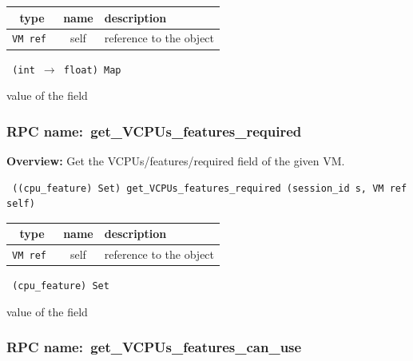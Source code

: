 
 
\vspace{0.3cm}
\begin{tabular}{|c|c|p{7cm}|}
 \hline
{\bf type} & {\bf name} & {\bf description} \\ \hline
{\tt VM ref } & self & reference to the object \\ \hline 

\end{tabular}

\vspace{0.3cm}

{\tt 
(int $\rightarrow$ float) Map
}


value of the field
\vspace{0.3cm}
\vspace{0.3cm}
\vspace{0.3cm}
\subsubsection{RPC name:~get\_VCPUs\_features\_required}

{\bf Overview:} 
Get the VCPUs/features/required field of the given VM.

\begin{verbatim} ((cpu_feature) Set) get_VCPUs_features_required (session_id s, VM ref self)\end{verbatim}



 
\vspace{0.3cm}
\begin{tabular}{|c|c|p{7cm}|}
 \hline
{\bf type} & {\bf name} & {\bf description} \\ \hline
{\tt VM ref } & self & reference to the object \\ \hline 

\end{tabular}

\vspace{0.3cm}

{\tt 
(cpu\_feature) Set
}


value of the field
\vspace{0.3cm}
\vspace{0.3cm}
\vspace{0.3cm}
\subsubsection{RPC name:~get\_VCPUs\_features\_can\_use}

